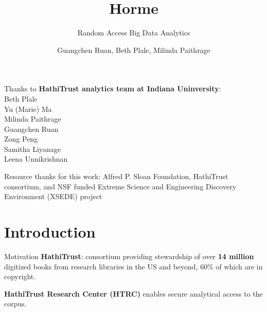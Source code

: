 \documentclass[newPxFont]{beamer}
\title{Horme}
\subtitle{Random Access Big Data Analytics}
\author{Guangchen Ruan, Beth Plale, Milinda Paithrage}
\institute{School of Informatics and Computing, Indiana University}
\begin{document}

%
%

\maketitle


%
%


\begin{frame}[c]{Thanks to}
 \textbf{HathiTrust analytics team at Indiana Uninversity}: \\
 Beth Plale \\
 Yu (Marie) Ma \\
 Milinda Paithrage \\
 Guangchen Ruan \\
 Zong Peng \\
 Samitha Liyanage \\
 Leena Unnikrishnan  
 
 
\vspace{1em}

Resource thanks for this work:  Alfred P. Sloan Foundation, HathiTrust consortium, and NSF funded Extreme Science and Engineering Discovery Environment (XSEDE) project
\end{frame}

\section{Introduction}


\begin{frame}[c]{Motivation}
\textbf{HathiTrust}:  consortium providing stewardship of over \textbf{14 million} digitized books from research libraries in the US and beyond, 60\% of which are in copyright.  

\vspace{1em}
\textbf{HathiTrust Research Center (HTRC)} enables secure analytical access to the corpus.  
\end{frame}
\end{document}
